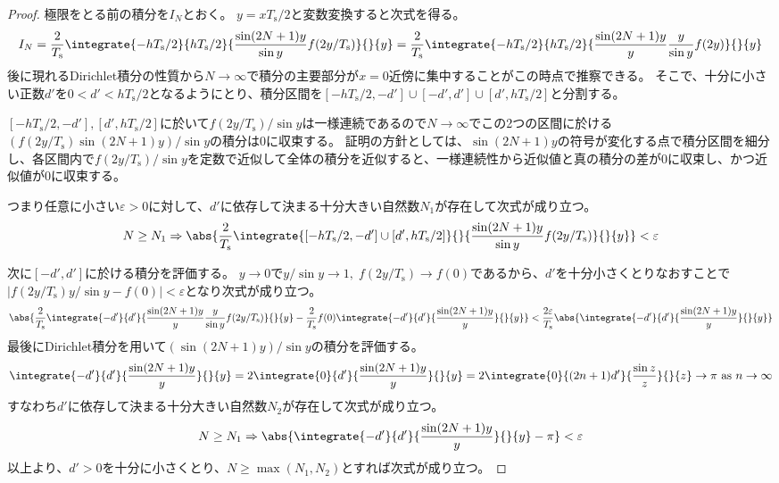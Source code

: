 			\begin{proof}
				\quad\par
				極限をとる前の積分を$I_N$とおく。
				$y = x T_\text{s}/2$と変数変換すると次式を得る。
				\[
					I_N = \frac{2}{T_\text{s}}\integrate{-h T_\text{s}/2}{h T_\text{s}/2}{\frac{\sin(2N+1)y}{\sin y}f(2y/T_\text{s})}{}{y} = \frac{2}{T_\text{s}}\integrate{-h T_\text{s}/2}{h T_\text{s}/2}{\frac{\sin(2N+1)y}{y}\frac{y}{\sin y}f(2y)}{}{y}
				\]
				後に現れるDirichlet積分の性質から$N\to\infty$で積分の主要部分が$x=0$近傍に集中することがこの時点で推察できる。
				そこで、十分に小さい正数$d'$を$0<d'<h T_\text{s}/2$となるようにとり、積分区間を$[-h T_\text{s}/2,-d']\cup[-d',d']\cup[d',h T_\text{s}/2]$と分割する。
				\par
				$[-h T_\text{s}/2,-d'], [d',h T_\text{s}/2]$に於いて$f(2y/T_\text{s})/\sin y$は一様連続であるので$N\to\infty$でこの2つの区間に於ける$(f(2y/T_\text{s})\sin(2N+1)y)/\sin y$の積分は0に収束する。
				証明の方針としては、$\sin(2N+1)y$の符号が変化する点で積分区間を細分し、各区間内で$f(2y/T_\text{s})/\sin y$を定数で近似して全体の積分を近似すると、一様連続性から近似値と真の積分の差が0に収束し、かつ近似値が0に収束する。
				\par
				つまり任意に小さい$\varepsilon>0$に対して、$d'$に依存して決まる十分大きい自然数$N_1$が存在して次式が成り立つ。
				\[
					N\geq N_1 \Rightarrow \abs{\frac{2}{T_\text{s}}\integrate{[-h T_\text{s}/2,-d']\cup[d',h T_\text{s}/2]}{}{\frac{\sin(2N+1)y}{\sin y}f(2y/T_\text{s})}{}{y}}<\varepsilon
				\]
				\par
				次に$[-d',d']$に於ける積分を評価する。
				$y\to 0$で$y/\sin y\to 1,\;f(2y/T_\text{s})\to f(0)$であるから、$d'$を十分小さくとりなおすことで$|f(2y/T_\text{s})y/\sin y - f(0)| < \varepsilon$となり次式が成り立つ。
				\[
					\abs{\frac{2}{T_\text{s}}\integrate{-d'}{d'}{\frac{\sin(2N+1)y}{y}\frac{y}{\sin y}f(2y/T_\text{s})}{}{y} - \frac{2}{T_\text{s}}f(0)\integrate{-d'}{d'}{\frac{\sin(2N+1)y}{y}}{}{y}} < \frac{2\varepsilon}{T_\text{s}}\abs{\integrate{-d'}{d'}{\frac{\sin(2N+1)y}{y}}{}{y}}
				\]
				最後にDirichlet積分を用いて$(\sin(2N+1)y)/\sin y$の積分を評価する。
				\[
					\integrate{-d'}{d'}{\frac{\sin(2N+1)y}{y}}{}{y} = 2\integrate{0}{d'}{\frac{\sin(2N+1)y}{y}}{}{y} = 2\integrate{0}{(2n+1)d'}{\frac{\sin z}{z}}{}{z} \to \pi \text{ as } n\to\infty
				\]
				すなわち$d'$に依存して決まる十分大きい自然数$N_2$が存在して次式が成り立つ。
				\[ N\geq N_1 \Rightarrow \abs{\integrate{-d'}{d'}{\frac{\sin(2N+1)y}{y}}{}{y} - \pi} < \varepsilon \]
				以上より、$d'>0$を十分に小さくとり、$N\geq\max(N_1,N_2)$とすれば次式が成り立つ。

\end{proof}
